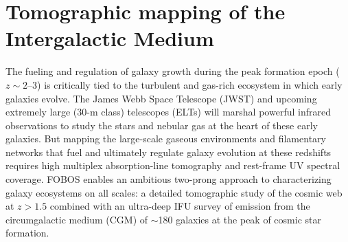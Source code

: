 \documentclass[11pt,a4paper,twoside,onecolumn,openany,final,oldfontcommands]{memoir}
\begin{document}
%    


\section{Tomographic mapping of the Intergalactic Medium}

The fueling and regulation of galaxy growth during the peak formation epoch ($z \sim2$--3) is critically tied to the turbulent and gas-rich ecosystem in which early galaxies evolve. The James Webb Space Telescope (JWST) and upcoming extremely large (30-m class) telescopes (ELTs) will marshal powerful infrared observations to study the stars and nebular gas at the heart of these early galaxies. But mapping the large-scale gaseous environments and filamentary networks that fuel and ultimately regulate galaxy evolution at these redshifts requires high multiplex absorption-line tomography and rest-frame UV spectral coverage.  FOBOS enables an ambitious two-prong approach to characterizing galaxy ecosystems on all scales: a detailed tomographic study of the cosmic web at $z>1.5$ combined with an ultra-deep IFU survey of emission from the circumgalactic medium (CGM) of $\sim$180 galaxies at the peak of cosmic star formation.
\end{document}
